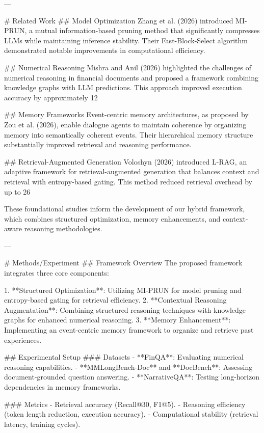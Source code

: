 ---

# Related Work  
## Model Optimization  
Zhang et al. (2026) introduced MI-PRUN, a mutual information-based pruning method that significantly compresses LLMs while maintaining inference stability. Their Fast-Block-Select algorithm demonstrated notable improvements in computational efficiency.  

## Numerical Reasoning  
Mishra and Anil (2026) highlighted the challenges of numerical reasoning in financial documents and proposed a framework combining knowledge graphs with LLM predictions. This approach improved execution accuracy by approximately 12%

## Memory Frameworks  
Event-centric memory architectures, as proposed by Zou et al. (2026), enable dialogue agents to maintain coherence by organizing memory into semantically coherent events. Their hierarchical memory structure substantially improved retrieval and reasoning performance.  

## Retrieval-Augmented Generation  
Voloshyn (2026) introduced L-RAG, an adaptive framework for retrieval-augmented generation that balances context and retrieval with entropy-based gating. This method reduced retrieval overhead by up to 26%

These foundational studies inform the development of our hybrid framework, which combines structured optimization, memory enhancements, and context-aware reasoning methodologies.  

---

# Methods/Experiment  
## Framework Overview  
The proposed framework integrates three core components:  

1. **Structured Optimization**: Utilizing MI-PRUN for model pruning and entropy-based gating for retrieval efficiency.  
2. **Contextual Reasoning Augmentation**: Combining structured reasoning techniques with knowledge graphs for enhanced numerical reasoning.  
3. **Memory Enhancement**: Implementing an event-centric memory framework to organize and retrieve past experiences.  

## Experimental Setup  
### Datasets  
- **FinQA**: Evaluating numerical reasoning capabilities.  
- **MMLongBench-Doc** and **DocBench**: Assessing document-grounded question answering.  
- **NarrativeQA**: Testing long-horizon dependencies in memory frameworks.  

### Metrics  
- Retrieval accuracy (Recall@30, F1@5).  
- Reasoning efficiency (token length reduction, execution accuracy).  
- Computational stability (retrieval latency, training cycles).  

